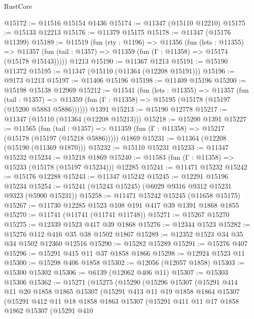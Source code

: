 \begin{lexlean}{RustCore}
\begin{coremodule}
@15172 := @11516 @15154 @1436
@15174 := @11347 (@15110 @12210)
@15175 := @15133 @12213
@15176 := @11379 @15175
@15178 := @11347 (@15176 @11399)
@15189 := @11519
    (fun (rty : @1196) =>
    @11356
      (fun (lets : @11355) =>
      @11357 (fun (tail : @1357) => @11359 (fun (Γ : @11358) => @15174 (@15178 @15143)))))
    @1213
@15190 := @11367 @1213
@15191 := @15190 @11372
@15195 := @11347 (@15110 (@11364 (@12208 @15191)))
@15196 := @9173 @1213
@15197 := @11406 @15196
@15198 := @11409 @15196
@15200 := @15198 @15138 @12969
@15212 := @11541
    (fun (lets : @11355) =>
    @11357
      (fun (tail : @1357) =>
      @11359 (fun (Γ : @11358) => @15195 (@15178 (@15197 (@15200 @5883 @5886))))))
    @1391
@15213 := @15190 @12778
@15217 := @11347 (@15110 (@11364 (@12208 @15213)))
@15218 := @15200 @1391
@15227 := @11565
    (fun (tail : @1357) => @11359 (fun (Γ : @11358) => @15217 (@15178 (@15197 (@15218 @5886)))))
    @1869
@15231 := @11364 (@12208 (@15190 (@11369 @1870)))
@15232 := @15110 @15231
@15233 := @11347 @15232
@15234 := @15218 @1869
@15240 := @11583 (fun (Γ : @11358) => @15233 (@15178 (@15197 @15234))) @12285
@15241 := @11471 @15232
@15242 := @15176 @12288
@15243 := @11347 @15242
@15245 := @12291 @15196 @15234
@15254 := @15241 (@15243 @15245) (@6029 @9316 @9312 @15231 @9323 (@5900 @15231))
@15258 := @11471 @15242 @15245 (@11658 @15175)
@15267 := @11730 @12285 @1523 @108 @191 @417 @39 @1391 @1868 @1855
@15270 := @11741 (@11741 (@11741 @11748))
@15271 := @15267 @15270
@15275 := @12339 @1523 @417 @39 @1868
@15276 := @12344 @1523
@15282 := @15276 @112 @416 @35 @38 @1502 @1867
@15289 := @12352 @1523 @34 @35 @34 @1502 @12360 @12516
@15290 := @15282 @15289
@15291 := @15276 @407
@15296 := @15291 @415 @11 @37 @1858 @1866
@15298 := @12924 @1523 @11
@15300 := @15298 @406 @1858
@15302 := @12056 (@12057 @1858)
@15303 := @15300 @15302
@15306 := @6139 (@12062 @406 @11)
@15307 := @15303 @15306
@15362 := @15271
    (@15275
      (@15290
        (@15296
          @15307
          (@15291
            @414
            @11
            @20
            @1858
            @1865
            @15307
            (@15291
              @413
              @11
              @19
              @1858
              @1864
              @15307
              (@15291
                @412
                @11
                @18
                @1858
                @1863
                @15307
                (@15291
                  @411
                  @11
                  @17
                  @1858
                  @1862
                  @15307
                  (@15291
                    @410

\end{coremodule}
\end{lexlean}
